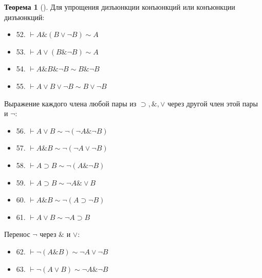 \documentclass[a4paper, 12pt]{article}  %
\DeclareMathOperator{\conj}{\mathbb{\&}}
\theoremstyle{definition}
\newtheorem{theorem}{Теорема}
\begin{document}
\begin{theorem}[]
		Для упрощения дизъюнкции конъюнкций или конъюнкции дизъюнкций:
		\begin{itemize}[label={}]
			\setlength\itemsep{0pt}	
			\item 52. $\vdash A \conj (B \vee \neg B) \sim A$		
			\item 53. $\vdash A \vee (B \conj \neg B) \sim A$		
			\item 54. $\vdash A \conj B \conj \neg B \sim B \conj \neg B$		
			\item 55. $\vdash A \vee B \vee \neg B \sim B \vee \neg B$
		\end{itemize}
		
		Выражение каждого члена любой пары из $\supset, \conj, \vee$ через другой член этой пары и $\neg$:
		\begin{itemize}[label={}]
			\setlength\itemsep{0pt}	
			\item 56. $\vdash A \vee B \sim \neg (\neg A \conj \neg B)$	
			\item 57. $\vdash A \conj B \sim \neg (\neg A \vee \neg B)$	
			\item 58. $\vdash A \supset B \sim \neg (A \conj \neg B)$	
			\item 59. $\vdash A \supset B \sim \neg A \conj \vee B$	
			\item 60. $\vdash A \conj B \sim \neg (A \supset \neg B)$		
			\item 61. $\vdash A \vee B \sim \neg A \supset B$
		\end{itemize}
		
		Перенос $\neg$ через $\conj$ и $\vee$:
		\begin{itemize}[label={}]
			\setlength\itemsep{0pt}	
			\item 62. $\vdash \neg (A \conj B) \sim \neg A \vee \neg B$
			\item 63. $\vdash \neg (A \vee B) \sim \neg A \conj \neg B$
		\end{itemize}
		

\end{theorem}
\end{document}
